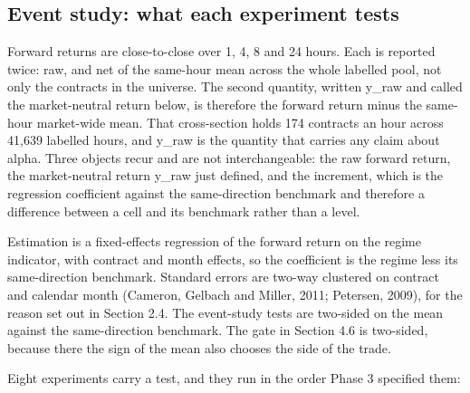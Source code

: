 \documentclass[11pt,a4paper]{article}
\begin{document}
\subsection{Event study: what each experiment tests}

Forward returns are close-to-close over 1, 4, 8 and 24 hours. Each is reported twice: raw, and net of the same-hour mean across the whole labelled pool, not only the contracts in the universe. The second quantity, written y\_raw and called the market-neutral return below, is therefore the forward return minus the same-hour market-wide mean. That cross-section holds 174 contracts an hour across 41,639 labelled hours, and y\_raw is the quantity that carries any claim about alpha. Three objects recur and are not interchangeable: the raw forward return, the market-neutral return y\_raw just defined, and the increment, which is the regression coefficient against the same-direction benchmark and therefore a difference between a cell and its benchmark rather than a level.

Estimation is a fixed-effects regression of the forward return on the regime indicator, with contract and month effects, so the coefficient is the regime less its same-direction benchmark. Standard errors are two-way clustered on contract and calendar month (Cameron, Gelbach and Miller, 2011; Petersen, 2009), for the reason set out in Section 2.4. The event-study tests are two-sided on the mean against the same-direction benchmark. The gate in Section 4.6 is two-sided, because there the sign of the mean also chooses the side of the trade.

Eight experiments carry a test, and they run in the order Phase 3 specified them:
\end{document}
